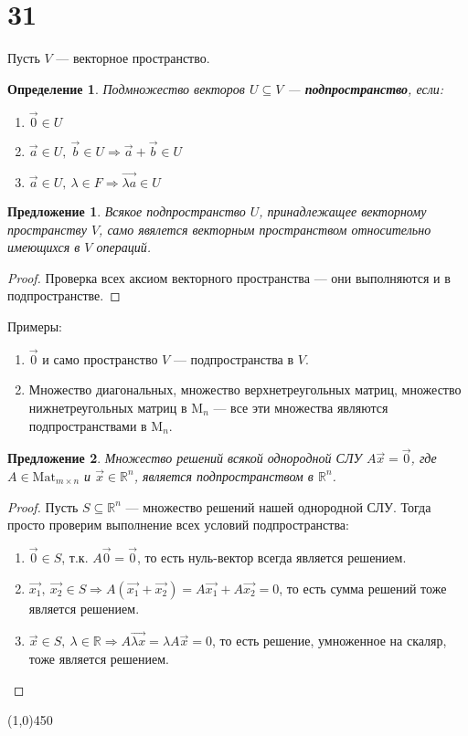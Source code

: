 \documentclass[a4paper,12pt]{article}
\newcommand{\Mat}{\mathrm{Mat}}
\newcommand{\M}{\mathrm{M}}
\newtheorem*{definition}{Определение}
\newtheorem*{proposal}{Предложение}
\newcommand{\R}{\mathbb{R}}
\begin{document}
	\section*{31}
	Пусть $V$ --- векторное пространство.
	\begin{definition}
		Подмножество векторов $U \subseteq V$ --- \textbf{подпространство}, если:
		\begin{enumerate}
			\item $\vec{0} \in U$
			\item $\vec{a} \in U,\ \vec{b} \in U \Rightarrow \vec{a} + \vec{b} \in U$
			\item $\vec{a} \in U,\ \lambda \in F \Rightarrow \vec{\lambda a} \in U$
		\end{enumerate}
	\end{definition}
	
	\begin{proposal}
		Всякое подпространство $U$, принадлежащее векторному пространству $V$, само явялется векторным пространством относительно имеющихся в $V$ операций.
	\end{proposal}
	\begin{proof}
		Проверка всех аксиом векторного пространства --- они выполняются и в подпространстве.
	\end{proof}
	Примеры:
	\begin{enumerate}
		\item $\vec{0}$ и само пространство $V$  --- подпространства в $V$.
		\item Множество диагональных, множество верхнетреугольных матриц, множество нижнетреугольных матриц в $\M_n$ --- все эти множества являются подпространствами в $\M_n$.
	\end{enumerate}
	
	\begin{proposal}
		Множество решений всякой однородной СЛУ $A\vec{x} = \vec{0}$, где $A \in \Mat_{m\times n}$ и $\vec{x} \in \R^n$, является подпространством в $\R^n$.
	\end{proposal}
	\begin{proof}
		Пусть $S \subseteq \R^n$ --- множество решений нашей однородной СЛУ. Тогда просто проверим выполнение всех условий подпространства:
		\begin{enumerate}
			\item $\vec{0} \in S$, т.к. $A\vec{0} = \vec0$, то есть нуль-вектор всегда является решением.
			\item $\vec{x_1},\ \vec{x_2} \in S \Rightarrow A(\vec{x_1} + \vec{x_2}) = A\vec{x_1} + A\vec{x_2}  = 0$, то есть сумма решений тоже является решением.
			\item $\vec{x} \in S,\ \lambda \in \R \Rightarrow A\vec{\lambda x} = \lambda A\vec{x} = 0$, то есть решение, умноженное на скаляр, тоже является решением.
		\end{enumerate}
	\end{proof}
	\begin{center}
		\line(1,0){450}
	\end{center}
\end{document}
